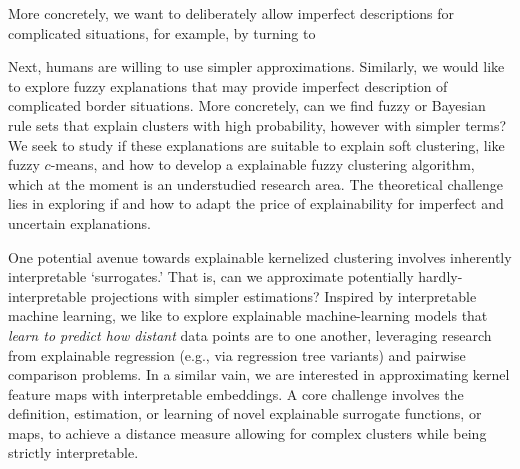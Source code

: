\documentclass[a4paper,11pt]{article}
\begin{document}
More concretely, we want to deliberately allow imperfect descriptions for complicated situations,
for example, by turning to 

Next, humans are willing to use simpler approximations.
Similarly, we would like to explore fuzzy explanations 
that may provide imperfect description of complicated border situations.
More concretely, can we find fuzzy or Bayesian rule sets that explain clusters with high probability, 
however with simpler terms?
We seek to study if these explanations are suitable to explain soft clustering, 
like fuzzy $c$-means, and how to develop a \joint explainable fuzzy clustering algorithm, 
which at the moment is an understudied research area.
The theoretical challenge lies in exploring if and how to adapt the price of explainability 
for imperfect and uncertain explanations. 

One potential avenue towards explainable kernelized clustering involves inherently interpretable `surrogates.'
That is, can we approximate potentially hardly-interpretable projections with simpler estimations?
Inspired by interpretable machine learning, we like to explore explainable machine-learning models that 
\emph{learn to predict how distant} data points are to one another, 
leveraging research from explainable regression (e.g., via regression tree variants) and pairwise comparison problems.
In a similar vain, we are interested in approximating kernel feature maps with interpretable embeddings. 
A core challenge involves the definition, estimation, or learning of novel explainable surrogate functions, 
or maps, to achieve a distance measure allowing for complex clusters while being strictly interpretable.
\end{document}
